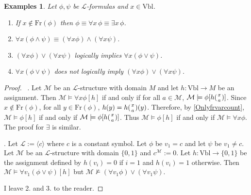 \documentclass[11pt]{article}
\newcommand{\Fr}{\textrm{Fr}}
\newcommand{\Vbl}{\textrm{Vbl}}
\newtheorem{examples}[theorem]{Examples}
\newcommand{\mcal}[1]{\mathcal{#1}}
\begin{document}
\begin{examples}\label{exallandor}
Let $\phi,\psi$ be $\mcal{L}$-formulas and $x\in\Vbl$.
\begin{enumerate}
\item If $x\notin \Fr(\phi)$ then $\phi\equiv \forall x \, \phi\equiv \exists x \,\phi$.
\item  $\forall x(\phi\wedge \psi)\equiv (\forall x\phi)\wedge(\forall x\psi)$.
\item $(\forall x\phi)\vee (\forall x\psi)$ logically implies $\forall x(\phi\vee \psi)$.
\item $\forall x(\phi\vee \psi)$ does not logically imply $(\forall x\phi)\vee (\forall x\psi)$.
\end{enumerate}
\end{examples}
\begin{proof}
\
. Let $\mcal{M}$ be an $\mcal{L}$-structure with domain $M$ and let $h:\Vbl\rightarrow M$ be an assignment. Then $\mcal{M}\models \forall x\phi[h]$ if and only if for all $a\in \mcal{M}$, $\mcal{M}\models \phi[h({x\atop a})]$. Since $x\notin \Fr(\phi)$, for all $y\in \Fr(\phi)$, $h(y)=h({x\atop a})(y)$. Therefore, by \ref{Onlyfrvarcount}, $\mcal{M}\models \phi[h]$ if and only if $\mcal{M}\models \phi[h({x\atop a})]$. Thus $\mcal{M}\models \phi[h]$ if and only if $\mcal{M}\models \forall x\phi$. The proof for $\exists$ is similar.

\smallskip

. Let $\mcal{L}:=\langle c\rangle$ where $c$ is a constant symbol. Let $\phi$ be $v_1=c$ and let $\psi$ be $v_1\neq c$. Let $\mcal{M}$ be an $\mcal{L}$-structure with domain $\{0,1\}$ and $c^{\mcal{M}}:=0$. Let $h:\Vbl\rightarrow \{0,1\}$ be the assignment defined by $h(v_i)=0$ if $i=1$ and $h(v_i)=1$ otherwise. Then $\mcal{M}\models \forall v_1(\phi\vee \psi)[h]$ but $\mcal{M}\nvDash (\forall v_1 \phi)\vee(\forall v_1 \psi)$.

\smallskip

\noindent
I leave 2. and 3. to the reader.
\end{proof}
\end{document}
